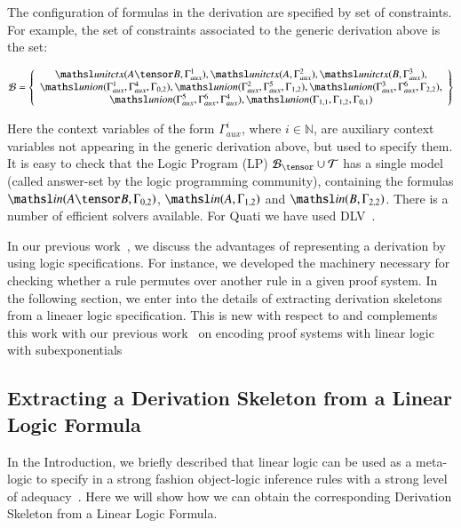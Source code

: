 \documentclass[a4paper,10pt]{article}
\newcommand{\elin}[2]{\ensuremath{{\tsl{unitctx}(\ensuremath{#1}, \ensuremath{#2})}}}
\newcommand{\union}[3]{\ensuremath{{\tsl{union}(\ensuremath{#1},\ensuremath{#2},\ensuremath{ #3})}}}
\newcommand{\In}[2]{\ensuremath{\tsl{in}(\ensuremath{#1},\ensuremath{#2})}}
\begin{document}
The configuration of formulas in the derivation are specified by set of constraints.
For example, the set of constraints associated to the generic derivation above is the 
set:
\begin{small}
\[
\Bscr = \left\{
\begin{array}{c}
\elin{A \tensor B}{\Gamma_{aux}^1},
\elin{A}{\Gamma_{aux}^2},
\elin{B}{\Gamma_{aux}^3}, \\
\union{\Gamma_{aux}^1}{\Gamma_{aux}^4}{\Gamma_{0,2}},
\union{\Gamma_{aux}^2}{\Gamma_{aux}^5}{\Gamma_{1,2}}, 
\union{\Gamma_{aux}^3}{\Gamma_{aux}^6}{\Gamma_{2,2}},\\
\union{\Gamma_{aux}^5}{\Gamma_{aux}^6}{\Gamma_{aux}^4},
\union{\Gamma_{1,1}}{\Gamma_{1,2}}{\Gamma_{0,1}}
\end{array}
\right\}
\]
\end{small}%
Here the context variables of the form $\Gamma_{aux}^i$, where $i \in \mathbb{N}$, are 
auxiliary context variables not appearing in the generic derivation above, 
but used to specify them. It is easy to check that the Logic Program (LP) $\Bscr_\tensor \cup \Tscr$
has a single model (called answer-set by the logic programming community), 
containing the formulas $\In{A \tensor B}{\Gamma_{0,2}}$,
$\In{A}{\Gamma_{1,2}}$ and $\In{B}{\Gamma_{2,2}}$. There is a number of efficient 
solvers available. For Quati we have used DLV~\cite{dlv}.

In our previous work~\cite{nigam13iclp}, we discuss the advantages of representing 
a derivation by using logic specifications. For instance, we developed the machinery 
necessary for checking whether a rule permutes over another rule in a given proof system.
In the following section, we enter into the details of extracting derivation skeletons
from a lineaer logic specification. This is new with respect to \cite{nigam13iclp} and 
complements this work with our previous work~\cite{nigam.jlc} on encoding proof systems with linear logic with 
subexponentials 

\subsection{Extracting a Derivation Skeleton from a Linear Logic Formula}

In the Introduction, we briefly described that linear logic can be used as a meta-logic 
to specify in a strong fashion object-logic inference rules with a strong level of 
adequacy~\cite{nigam10jar}. Here we will show how we can obtain the corresponding
Derivation Skeleton from a Linear Logic Formula. 
\end{document}
